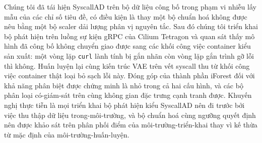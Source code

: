 Chúng tôi đã tái hiện SyscallAD trên bộ dữ liệu công bố trong phạm
vi nhiễu lấy mẫu của các chỉ số tiêu đề, có điều kiện là thay một
bộ chuẩn hoá không được nêu bằng một bộ scaler dải lượng phân vị
nguyên tắc. Sau đó chúng tôi triển khai bộ phát hiện trên luồng sự
kiện gRPC của Cilium Tetragon và quan sát thấy mô hình đã công bố
không chuyển giao được sang các khối công việc container kiểu sản
xuất: một vòng lặp \texttt{curl} lành tính bị gắn nhãn còn vòng lặp
gắn trình gỡ lỗi thì không. Huấn luyện lại cùng kiến trúc VAE trên
vết syscall thu từ khối công việc container thật loại bỏ sạch lỗi
này. Đóng góp của thành phần iForest đối với khả năng phân biệt
được chứng minh là nhỏ trong cả hai cấu hình, và các bộ phân loại
có-giám-sát trên cùng không gian đặc trưng cạnh tranh được. Khuyến
nghị thực tiễn là mọi triển khai bộ phát hiện kiểu SyscallAD nên đi
trước bởi việc thu thập dữ liệu trong-môi-trường, và bộ chuẩn hoá
cùng ngưỡng quyết định nên được khảo sát trên phân phối điểm của
môi-trường-triển-khai thay vì kế thừa từ mặc định của
môi-trường-huấn-luyện.

